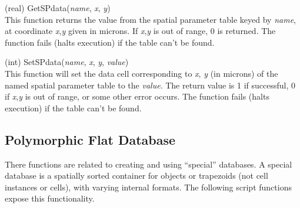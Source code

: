 \begin{description}
\item{(real) \vt GetSPdata({\it name\/}, {\it x\/}, {\it y\/})}\\
This function returns the value from the spatial parameter table keyed
by {\it name\/}, at coordinate {\it x\/},{\it y} given in microns.  If
{\it x\/},{\it y} is out of range, 0 is returned.  The function fails
(halts execution) if the table can't be found.

\item{(int) \vt SetSPdata({\it name\/}, {\it x\/}, {\it y\/}, {\it value\/})}\\
This function will set the data cell corresponding to {\it x\/},{\it
y} (in microns) of the named spatial parameter table to the {\it
value\/}.  The return value is 1 if successful, 0 if {\it x\/},{\it y}
is out of range, or some other error occurs.  The function fails
(halts execution) if the table can't be found.

\end{description}


\subsection{Polymorphic Flat Database}
\label{specdb}

There functions are related to creating and using ``special''
databases.  A special database is a spatially sorted container for
objects or trapezoids (not cell instances or cells), with varying
internal formats.  The following script functions expose this
functionality.

